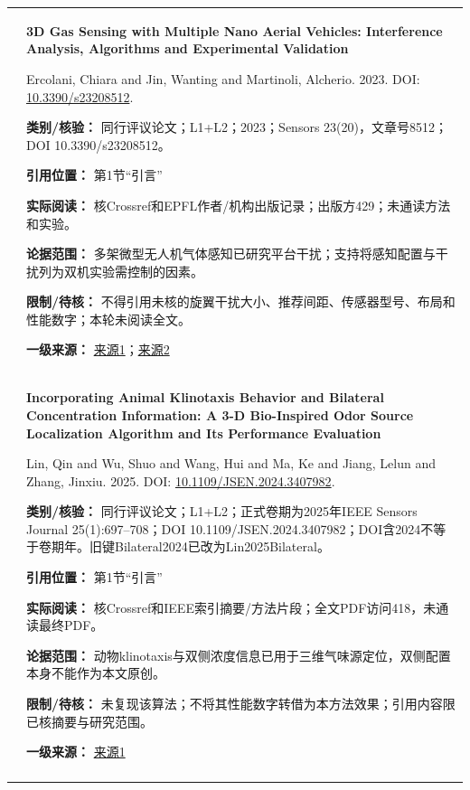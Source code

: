 \begin{longtable}{@{}>{\raggedright\arraybackslash}p{0.7cm}>{\raggedright\arraybackslash}p{14.8cm}@{}}
5 & \textbf{3D Gas Sensing with Multiple Nano Aerial Vehicles: Interference Analysis, Algorithms and Experimental Validation}\par Ercolani, Chiara and Jin, Wanting and Martinoli, Alcherio. 2023. DOI: \url{10.3390/s23208512}. \par\textbf{类别/核验：} 同行评议论文；L1+L2；2023；Sensors 23(20)，文章号8512；DOI 10.3390/s23208512。\par\textbf{引用位置：} 第1节“引言”\par\textbf{实际阅读：} 核Crossref和EPFL作者/机构出版记录；出版方429；未通读方法和实验。\par\textbf{论据范围：} 多架微型无人机气体感知已研究平台干扰；支持将感知配置与干扰列为双机实验需控制的因素。\par\textbf{限制/待核：} 不得引用未核的旋翼干扰大小、推荐间距、传感器型号、布局和性能数字；本轮未阅读全文。\par\textbf{一级来源：} \href{https://www.mdpi.com/1424-8220/23/20/8512}{来源1}；\href{https://www.epfl.ch/labs/disal/research/gassensingstructure/}{来源2} \\\addlinespace[6pt]
6 & \textbf{Incorporating Animal Klinotaxis Behavior and Bilateral Concentration Information: A 3-D Bio-Inspired Odor Source Localization Algorithm and Its Performance Evaluation}\par Lin, Qin and Wu, Shuo and Wang, Hui and Ma, Ke and Jiang, Lelun and Zhang, Jinxiu. 2025. DOI: \url{10.1109/JSEN.2024.3407982}. \par\textbf{类别/核验：} 同行评议论文；L1+L2；正式卷期为2025年IEEE Sensors Journal 25(1):697–708；DOI 10.1109/JSEN.2024.3407982；DOI含2024不等于卷期年。旧键Bilateral2024已改为Lin2025Bilateral。\par\textbf{引用位置：} 第1节“引言”\par\textbf{实际阅读：} 核Crossref和IEEE索引摘要/方法片段；全文PDF访问418，未通读最终PDF。\par\textbf{论据范围：} 动物klinotaxis与双侧浓度信息已用于三维气味源定位，双侧配置本身不能作为本文原创。\par\textbf{限制/待核：} 未复现该算法；不将其性能数字转借为本方法效果；引用内容限已核摘要与研究范围。\par\textbf{一级来源：} \href{https://ieeexplore.ieee.org/document/10551708/}{来源1} \\\addlinespace[6pt]

\end{longtable}
